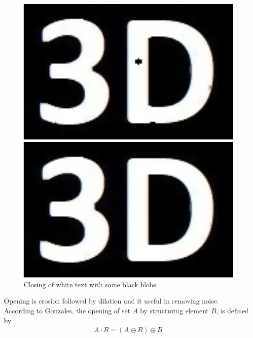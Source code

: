 \begin{figure}[h!]
\begin{minipage}[t]{0.24\textwidth}
 		\includegraphics[width=1\textwidth]{figures/ImageAnalysis/Reconstruct/3D_Close_Ellipse.jpg}
 	\end{minipage}
 	\begin{minipage}[t]{0.24\textwidth}
 		\centering	
 		\includegraphics[width=1\textwidth]{figures/ImageAnalysis/Reconstruct/3D_Close_Rectangle.jpg}
 	\end{minipage}
 	\caption{Closing of white text with some black blobs.}
 	\label{fig:closing}
 \end{figure}



Opening is erosion followed by dilation and it useful in removing noise. \\
According to Gonzales, the opening of set $A$ by structuring element $B$, is defined by
\begin{align*}
	A\cdot B = \left(A \ominus B\right) \oplus B
\end{align*}


